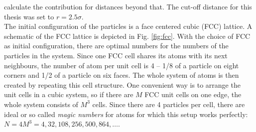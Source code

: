 \documentclass[12pt]{article}
\begin{document}
calculate the contribution for distances beyond that. The cut-off distance for this thesis was set to $r = 2.5\sigma$.\\
The initial configuration of the particles is a face centered cubic (FCC) lattice. A schematic of the FCC lattice is depicted in Fig. \ref{fig:fcc}.
With the choice of FCC as initial configuration, there are optimal numbers for the numbers of the particles in the system. Since one FCC cell 
shares its atoms with its next neighbours, the number of atom per unit cell is 4 -- 1/8 of a particle on eight corners and 1/2 of a particle on six faces.
The whole system of atoms is then created by repeating this cell structure. One convenient way is to arrange the unit cells in a cubic system, 
so if there are $M$ FCC unit cells on one edge, the whole system consists of $M^3$ cells. Since there are 4 particles per cell, 
there are ideal or so called \textit{magic numbers} for atoms for which this setup works perfectly: $N = 4M^3 = 4,32,108,256,500,864,\ldots$.\\
\end{document}
